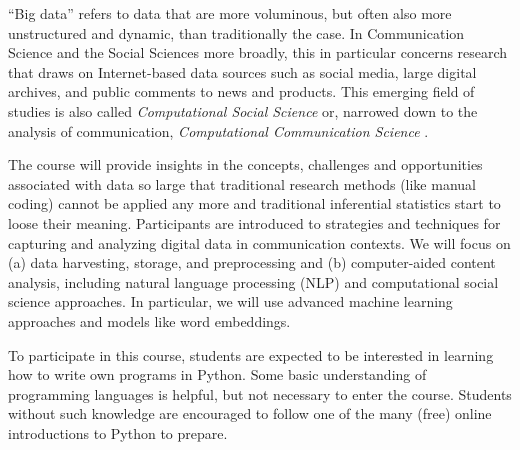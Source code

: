 
``Big data'' refers to data that are more voluminous, but often also more unstructured and dynamic, than traditionally the case. In Communication Science and the Social Sciences more broadly, this in particular concerns research that draws on Internet-based data sources such as social media, large digital archives, and public comments to news and products. This emerging field of studies is also called \emph{Computational Social Science} \citep{Lazer2009} or, narrowed down to the analysis of communication, \emph{Computational Communication Science} \citep{Shah2015}.

The course will provide insights in the concepts, challenges and opportunities associated with data so large that traditional research methods (like manual coding) cannot be applied any more and traditional inferential statistics start to loose their meaning. Participants are introduced to strategies and techniques for capturing and analyzing digital data in communication contexts. We will focus on (a) data harvesting, storage, and preprocessing and (b) computer-aided content analysis, including natural language processing (NLP) and computational social science approaches. In particular, we will use advanced machine learning approaches and models like word embeddings.

To participate in this course, students are expected to be interested in learning how to write own programs in Python. Some basic understanding of programming languages is helpful, but not necessary to enter the course. Students without such knowledge are encouraged to follow one of the many (free) online introductions to Python to prepare.
